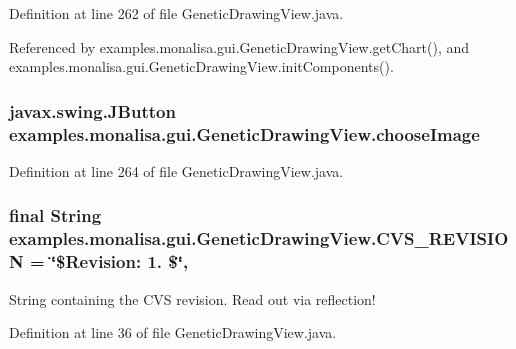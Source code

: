 Definition at line 262 of file Genetic\-Drawing\-View.\-java.



Referenced by examples.\-monalisa.\-gui.\-Genetic\-Drawing\-View.\-get\-Chart(), and examples.\-monalisa.\-gui.\-Genetic\-Drawing\-View.\-init\-Components().

\hypertarget{classexamples_1_1monalisa_1_1gui_1_1_genetic_drawing_view_af2fed74398219a22484041ae8cead137}{
\subsubsection[{choose\-Image}]{\setlength{\rightskip}{0pt plus 5cm}javax.\-swing.\-J\-Button examples.\-monalisa.\-gui.\-Genetic\-Drawing\-View.\-choose\-Image\hspace{0.3cm}{\ttfamily [private]}}}\label{classexamples_1_1monalisa_1_1gui_1_1_genetic_drawing_view_af2fed74398219a22484041ae8cead137}


Definition at line 264 of file Genetic\-Drawing\-View.\-java.

\hypertarget{classexamples_1_1monalisa_1_1gui_1_1_genetic_drawing_view_ab369434ac61a0e46b59a87532f71e46a}{
\subsubsection[{C\-V\-S\-\_\-\-R\-E\-V\-I\-S\-I\-O\-N}]{\setlength{\rightskip}{0pt plus 5cm}final String examples.\-monalisa.\-gui.\-Genetic\-Drawing\-View.\-C\-V\-S\-\_\-\-R\-E\-V\-I\-S\-I\-O\-N = \char`\"{}\$Revision\-: 1. \$\char`\"{}\hspace{0.3cm}{\ttfamily [static]}, {\ttfamily [private]}}}\label{classexamples_1_1monalisa_1_1gui_1_1_genetic_drawing_view_ab369434ac61a0e46b59a87532f71e46a}
String containing the C\-V\-S revision. Read out via reflection! 

Definition at line 36 of file Genetic\-Drawing\-View.\-java.

